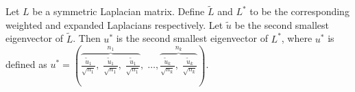 
\begin{proposition}
\label{prop:dave}
Let $L$ be a symmetric Laplacian matrix. Define $\tilde{L}$ and $L^*$ to be the corresponding weighted and expanded Laplacians respectively. Let $\tilde{u}$ be the second smallest eigenvector of  $\tilde{L}$.  Then $u^*$ is the second smallest eigenvector of $L^*$, where $u^*$ is defined as $u^* =  \left( \overbrace{\frac{\tilde{u}_1}{\sqrt{n_1}}, \; \frac{\tilde{u}_1}{\sqrt{n_1}}, \; \frac{\tilde{u}_1}{\sqrt{n_1}}}^{n_1}, \; \hdots, \overbrace{\frac{\tilde{u}_k}{\sqrt{n_k}}, \; \frac{\tilde{u}_k}{\sqrt{n_k}}}^{n_k} \right)$. 
\end{proposition}

